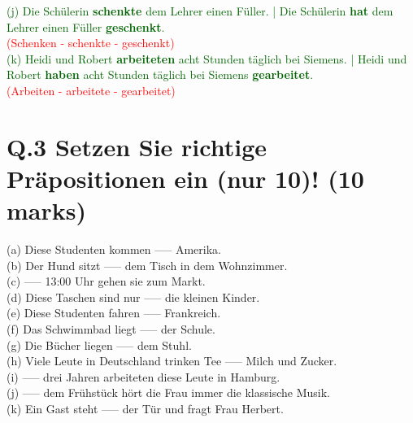 \documentclass[a4paper,12pt]{article}
\begin{document}
\textcolor{darkgreen}{(j) Die Schülerin \textbf{schenkte} dem Lehrer einen Füller. | Die Schülerin \textbf{hat} dem Lehrer einen Füller \textbf{geschenkt}.}\\ \textcolor{red}{(Schenken - schenkte - geschenkt)}\\
\textcolor{darkgreen}{(k) Heidi und Robert \textbf{arbeiteten} acht Stunden täglich bei Siemens. | Heidi und Robert \textbf{haben} acht Stunden täglich bei Siemens \textbf{gearbeitet}.}\\ \textcolor{red}{(Arbeiten - arbeitete - gearbeitet)}



\vspace{1cm}

\section*{Q.3 Setzen Sie richtige Präpositionen ein (nur 10)! (10 marks)}

(a) Diese Studenten kommen ----- Amerika.\\
(b) Der Hund sitzt ----- dem Tisch in dem Wohnzimmer.\\
(c) ----- 13:00 Uhr gehen sie zum Markt.\\
(d) Diese Taschen sind nur ----- die kleinen Kinder.\\
(e) Diese Studenten fahren ----- Frankreich.\\
(f) Das Schwimmbad liegt ----- der Schule.\\
(g) Die Bücher liegen ----- dem Stuhl.\\
(h) Viele Leute in Deutschland trinken Tee ----- Milch und Zucker.\\
(i) ----- drei Jahren arbeiteten diese Leute in Hamburg.\\
(j) ----- dem Frühstück hört die Frau immer die klassische Musik.\\
(k) Ein Gast steht ----- der Tür und fragt Frau Herbert.
\end{document}
